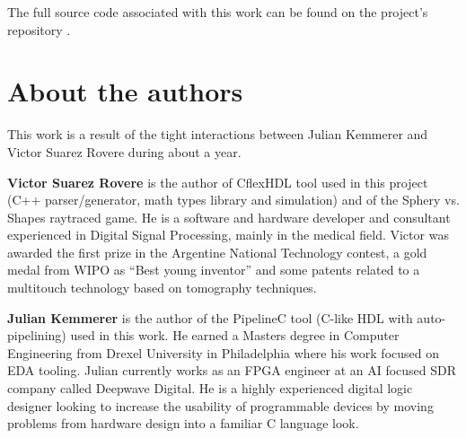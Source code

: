 \documentclass[conference]{IEEEtran}
\begin{document}
The full source code associated with this work can be found on the project's repository \cite{mainrepo}.
\\

\section{About the authors}
This work is a result of the tight interactions between Julian Kemmerer and Victor Suarez Rovere during about a year.

\textbf{Victor Suarez Rovere} is the author of CflexHDL tool used in this project (C++ parser/generator, math types library and simulation) and of the Sphery vs. Shapes raytraced game. He is a software and hardware developer and consultant experienced in Digital Signal Processing, mainly in the medical ﬁeld. Victor was awarded the ﬁrst prize in the Argentine National Technology contest, a gold medal from WIPO as “Best young inventor” and some patents related to a multitouch technology based on tomography techniques.

\textbf{Julian Kemmerer} is the author of the PipelineC tool (C-like HDL with auto-pipelining) used in this work. He earned a Masters degree in Computer Engineering from Drexel University in Philadelphia where his work focused on EDA tooling. Julian currently works as an FPGA engineer at an AI focused SDR company called Deepwave Digital. He is a highly experienced digital logic designer looking to increase the usability of programmable devices by moving problems from hardware design into a familiar C language look.
\\
\end{document}
